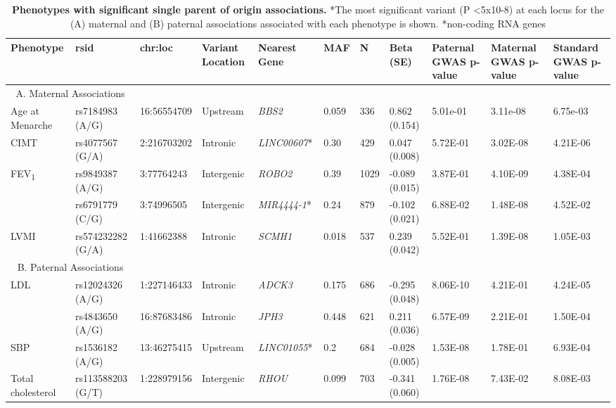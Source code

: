 \begin{table}
\centering
\begin{adjustbox}{width={\textwidth}}
\begin{tabular}{@{}p{3cm}|p{2cm}p{2cm}p{2cm}p{2.5cm}p{1cm}p{0.5cm}p{1.5cm}p{2cm}p{2cm}p{2cm}@{}}
\toprule Phenotype & rsid & chr:loc & Variant Location & Nearest Gene & MAF & N & Beta (SE) & Paternal GWAS p-value & Maternal GWAS p-value & Standard GWAS p-value \\ \midrule
 \multicolumn{2}{c}{A. Maternal Associations} &&&&&&&&& \\ \hline
Age at Menarche  & rs7184983 (A/G) & 16:56554709 & Upstream & \emph{BBS2} & 0.059 & 336 & 0.862 (0.154) & 5.01e-01 & 3.11e-08 & 6.75e-03 \\ \hline
CIMT  & rs4077567 (G/A) & 2:216703202 & Intronic & \emph{LINC00607}* & 0.30	& 429 & 0.047 (0.008) & 5.72E-01 & 3.02E-08 & 4.21E-06 \\  \hline
\multirow{2}{3cm}{FEV\textsubscript{1}} & rs9849387 (A/G)	& 3:77764243 & Intergenic & \emph{ROBO2} & 0.39 & 1029 & -0.089 (0.015) & 3.87E-01 & 4.10E-09 & 4.38E-04 \\ \cline{2-11}
 & rs6791779 (C/G) & 3:74996505 & Intergenic & \emph{MIR4444-1}* & 0.24 & 879 & -0.102 (0.021) & 6.88E-02 & 1.48E-08 & 4.52E-02\\ \hline
LVMI & rs574232282 (G/A) & 1:41662388 & Intronic & \emph{SCMH1} & 0.018 & 537 & 0.239 (0.042) & 5.52E-01 & 1.39E-08 & 1.05E-03\\ \hline
\multicolumn{2}{c}{B. Paternal Associations} &&&&&&&&&\\  \hline
\multirow{2}{3cm}{LDL} & rs12024326 (A/G) & 1:227146433 & Intronic & \emph{ADCK3} & 0.175 & 686 & -0.295 (0.048) & 8.06E-10 & 4.21E-01 & 4.24E-05\\ \cline{2-11}
 & rs4843650 (A/G) & 16:87683486 & Intronic & \emph{JPH3} & 0.448 & 621 & 0.211 (0.036) & 6.57E-09 & 2.21E-01 & 1.50E-04\\ \hline
SBP & rs1536182 (A/G) & 13:46275415 & Upstream & \emph{LINC01055}* & 0.2 & 684 & -0.028 (0.005)	& 1.53E-08 & 1.78E-01 & 6.93E-04\\ \hline
Total cholesterol & rs113588203 (G/T) & 1:228979156 & Intergenic & \emph{RHOU} & 0.099 & 703 & -0.341 (0.060) & 1.76E-08 & 7.43E-02 & 8.08E-03\\ \bottomrule
\end{tabular}
\end{adjustbox}
\caption[Phenotypes with significant single parent of origin associations. ]{\textbf{Phenotypes with significant single parent of origin associations.}
 *The most significant variant (P \textless 5x10-8) at each locus for the (A) maternal and (B) paternal associations associated with each phenotype is shown. 
*non-coding RNA genes}
\label{tab:singleparent}
\end{table}


